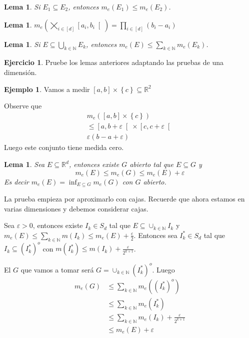\documentclass[12pt]{article}
\theoremstyle{plain}
\newtheorem{Lem}[Th]{Lema}             %
\theoremstyle{definition}
\newtheorem{Ex}[Th]{Ejemplo}               %
\newtheorem{Ej}[Th]{Ejercicio}
\theoremstyle{remark}
\numberwithin{equation}{section}
\newcommand{\bN}{\mathbb{N}}        %
\newcommand{\bR}{\mathbb{R}}        %
\renewcommand{\leq}{\leqslant}      %
\renewcommand{\:}{\colon}           %
\newcommand{\conj}[1]{\left\lbrace#1\right\rbrace}
\newcommand{\bonj}[1]{\left\lbrack#1\right\rbrack}
\newcommand{\lbonj}[1]{\left\lbrack#1\right\lbrack}
\begin{document}
\begin{multicols}{2}
\begin{Lem}
  Si $E_1\subseteq E_2$, entonces $m_e(E_1)\leq m_e(E_2)$.
\end{Lem}

\begin{Lem}
  $m_e(\bigtimes_{i\in\bonj{d}}\lbonj{a_i,b_i})=\prod_{i\in\bonj{d}}(b_i-a_i)$
\end{Lem}

\begin{Lem}
Si $E\subseteq\bigcup_{k\in\bN}E_k$, entonces $m_e(E)\leq\sum_{k\in\bN}m_e(E_k)$.
\end{Lem}

\begin{Ej}
  Pruebe los lemas anteriores adaptando las pruebas de una dimensión.
\end{Ej}

\begin{Ex}
  Vamos a medir $\bonj{a,b}\times\conj{c}\subseteq\bR^2$

\end{Ex}

\begin{ptcb}
Observe que
\begin{gather*}
  m_e(\bonj{a,b}\times\conj{c})\\
  \leq \lbonj{a,b+\varepsilon}\times\lbonj{c,c+\varepsilon}\\
  \varepsilon(b-a+\varepsilon)
\end{gather*}
Luego este conjunto tiene medida cero.
\end{ptcb}

\begin{Lem}
  Sea $E\subseteq\bR^d$, entonces existe $G$ abierto tal que $E\subseteq G$ y
  $$m_e(E)\leq m_e(G)\leq m_e(E)+\varepsilon$$
  Es decir $m_e(E)=\inf_{E\subseteq G}m_e(G)$ con $G$ abierto.
\end{Lem}

La prueba empieza por aproximarlo con cajas. Recuerde que ahora estamos en varias dimensiones y debemos considerar cajas.
\begin{ptcbp}
Sea $\varepsilon>0$, entonces existe $I_k\in S_d$ tal que $E\subseteq\cup_{k\in\bN}I_k$ y $m_e(E)\leq \sum_{k\in\bN}m(I_k)\leq m_e(E)+\frac{\varepsilon}{2}$. Entonces sea $I_k^*\in S_d$ tal que $I_k\subseteq(I_k^*)^o$ con $m(I_k^*)\leq m(I_k)+\frac{\varepsilon}{2^{k+1}}$. \par
El $G$ que vamos a tomar será $G=\cup_{k\in\bN}(I_k^*)^o$. Luego
\begin{align*}
  m_e(G) &\leq \sum_{k\in\bN}m_e((I_k^*)^o)\\
  &\leq \sum_{k\in\bN}m_e(I_k^*)\\
  &\leq \sum_{k\in\bN}m_e(I_k)+\frac{\varepsilon}{2^{k+1}}\\
  &\leq m_e(E)+\varepsilon
\end{align*}
\end{ptcbp}


\end{multicols}
\end{document}
